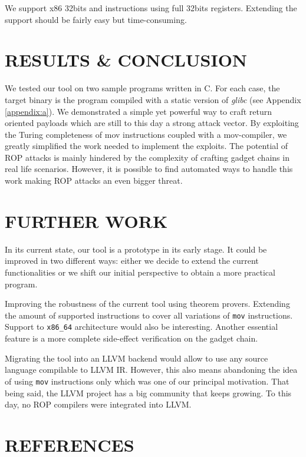 \documentclass[10pt,twocolumn]{article}
\begin{document}
We support x86 32bits and instructions using full 32bits registers. Extending
the support should be fairly easy but time-consuming.
 

\section{RESULTS \& CONCLUSION}
  We tested our tool on two sample programs written in C. For each case, the
  target binary is the program compiled with a static version of \textit{glibc}
  (see Appendix \ref{appendix:a}).
  We demonstrated a simple yet powerful way to craft return oriented payloads
  which are still to this day a strong attack vector. By exploiting the Turing
  completeness of mov instructions coupled with a mov-compiler, we greatly
  simplified the work needed to implement the exploits. The potential of ROP
  attacks is mainly hindered by the complexity of crafting gadget chains in real
  life scenarios. However, it is possible to find automated ways to handle this
  work making ROP attacks an even bigger threat.

\section{FURTHER WORK}

In its current state, our tool is a prototype in its early stage. It could be
improved in two different ways: either we decide to extend the current
functionalities or we shift our initial perspective to obtain a more practical
program.

Improving the robustness of the current tool using theorem provers. Extending
the amount of supported instructions to cover all variations of \texttt{mov}
instructions. Support to \texttt{x86\_64} architecture would also be
interesting. Another essential feature is a more complete side-effect
verification on the gadget chain.

Migrating the tool into an LLVM backend would allow to use any source language
compilable to LLVM IR. However, this also means abandoning the idea of using
\texttt{mov} instructions only which was one of our principal motivation. That
being said, the LLVM project has a big community that keeps growing. To this
day, no ROP compilers were integrated into LLVM.


\section{REFERENCES}
\begingroup
\renewcommand{\section}[2]{}

\small
\endgroup
\end{document}
